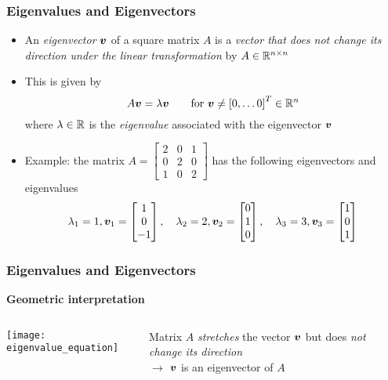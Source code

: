 \documentclass[%
  final,
  11pt, 
  show notes, %
  t, %
  fleqn, %
]{beamer}
\begin{document}
\begin{frame}[fragile]
  \frametitle{Eigenvalues and Eigenvectors}
\begin{itemize}
\item An \emph{eigenvector} $\bm{v}$ of a square matrix $A$ is a \emph{vector that does not change its direction under the linear transformation} by $A \in \mathbb{R}^{n \times n}$
\item This is given by \begin{equation*}
A \bm{v} = \lambda \bm{v} \qquad \text{for } \bm{v} \neq \left[ 0, \ldots 0 \right]^T \in\mathbb{R}^{n}
\end{equation*}
where $\lambda \in\mathbb{R}$ is the \emph{eigenvalue} associated with the eigenvector $\bm{v}$
\item Example: the matrix 
$A = \begin{bmatrix}
2 & 0 & 1 \\
0 & 2 & 0 \\
1 & 0 & 2
\end{bmatrix}$
has the following eigenvectors and eigenvalues
\begin{equation*}
\lambda_1 = 1, \bm{v}_1 = \begin{bmatrix} 1 \\ 0 \\ -1 \end{bmatrix},
\quad
\lambda_2 = 2, \bm{v}_2 = \begin{bmatrix} 0 \\ 1 \\ 0 \end{bmatrix},
\quad
\lambda_3 = 3, \bm{v}_3 = \begin{bmatrix} 1 \\ 0 \\ 1 \end{bmatrix}
\end{equation*}
\end{itemize}
\end{frame}

\begin{frame}[fragile]
  \frametitle{Eigenvalues and Eigenvectors}
\textbf{Geometric interpretation}

\begin{columns}[T]
\begin{column}{.5\textwidth}
\texttt{[image: eigenvalue\_equation]}
\end{column}
\begin{column}{.4\textwidth}
{\small Matrix $A$ \emph{stretches} the vector $\bm{v}$ but does \emph{not change its direction}\\
$\rightarrow$ $\bm{v}$ is an eigenvector of $A$}
\end{column}
\end{columns}
\end{frame}
\end{document}
